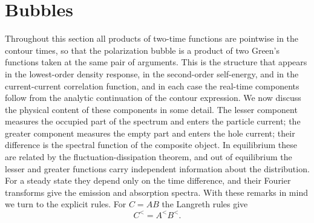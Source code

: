 \documentclass{article}
\begin{document}
\section{Bubbles}
Throughout this section all products of two-time functions are pointwise in the contour times,
so that the polarization bubble is a product of two Green's functions taken at the same pair of
arguments. This is the structure that appears in the lowest-order density response, in the
second-order self-energy, and in the current-current correlation function, and in each case the
real-time components follow from the analytic continuation of the contour expression. We now
discuss the physical content of these components in some detail. The lesser component measures
the occupied part of the spectrum and enters the particle current; the greater component measures
the empty part and enters the hole current; their difference is the spectral function of the
composite object. In equilibrium these are related by the fluctuation-dissipation theorem, and
out of equilibrium the lesser and greater functions carry independent information about the
distribution. For a steady state they depend only on the time difference, and their Fourier
transforms give the emission and absorption spectra. With these remarks in mind we turn to the
explicit rules. For $C = AB$ the Langreth rules give
\begin{equation}
C^{<} = A^{<} B^{<} .
\label{eq:pl}
\end{equation}
\end{document}
